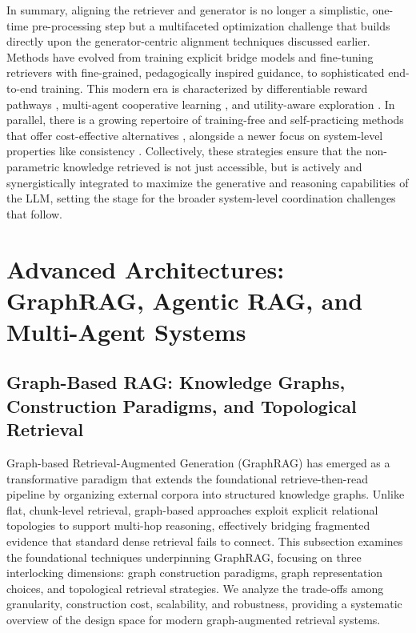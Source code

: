 \documentclass[11pt]{article}
\begin{document}
In summary, aligning the retriever and generator is no longer a simplistic, one-time pre-processing step but a multifaceted optimization challenge that builds directly upon the generator-centric alignment techniques discussed earlier. Methods have evolved from training explicit bridge models and fine-tuning retrievers with fine-grained, pedagogically inspired guidance, to sophisticated end-to-end training. This modern era is characterized by differentiable reward pathways \cite{ref20}, multi-agent cooperative learning \cite{ref279}, and utility-aware exploration \cite{ref276}. In parallel, there is a growing repertoire of training-free and self-practicing methods that offer cost-effective alternatives \cite{ref281,ref282}, alongside a newer focus on system-level properties like consistency \cite{ref283}. Collectively, these strategies ensure that the non-parametric knowledge retrieved is not just accessible, but is actively and synergistically integrated to maximize the generative and reasoning capabilities of the LLM, setting the stage for the broader system-level coordination challenges that follow.

\section{Advanced Architectures: GraphRAG, Agentic RAG, and Multi-Agent Systems}

\subsection{Graph-Based RAG: Knowledge Graphs, Construction Paradigms, and Topological Retrieval}

Graph-based Retrieval-Augmented Generation (GraphRAG) has emerged as a transformative paradigm that extends the foundational retrieve-then-read pipeline by organizing external corpora into structured knowledge graphs. Unlike flat, chunk-level retrieval, graph-based approaches exploit explicit relational topologies to support multi-hop reasoning, effectively bridging fragmented evidence that standard dense retrieval fails to connect. This subsection examines the foundational techniques underpinning GraphRAG, focusing on three interlocking dimensions: graph construction paradigms, graph representation choices, and topological retrieval strategies. We analyze the trade-offs among granularity, construction cost, scalability, and robustness, providing a systematic overview of the design space for modern graph-augmented retrieval systems.
\end{document}
